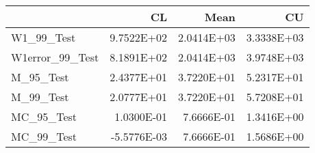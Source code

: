 \begin{tabular}{lrrr}
\toprule
{} &          CL &       Mean &         CU \\
\midrule
W1\_99\_Test      &  9.7522E+02 & 2.0414E+03 & 3.3338E+03 \\
W1error\_99\_Test &  8.1891E+02 & 2.0414E+03 & 3.9748E+03 \\
M\_95\_Test       &  2.4377E+01 & 3.7220E+01 & 5.2317E+01 \\
M\_99\_Test       &  2.0777E+01 & 3.7220E+01 & 5.7208E+01 \\
MC\_95\_Test      &  1.0300E-01 & 7.6666E-01 & 1.3416E+00 \\
MC\_99\_Test      & -5.5776E-03 & 7.6666E-01 & 1.5686E+00 \\
\bottomrule
\end{tabular}
